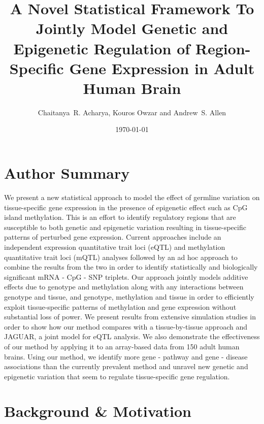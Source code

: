 \documentclass[hidelinks]{article}
\title{A Novel Statistical Framework To Jointly Model Genetic and Epigenetic Regulation of Region-Specific Gene Expression in Adult Human Brain}
\author{Chaitanya~R. Acharya, Kouros Owzar and Andrew~S. Allen}
\date{\today}
\begin{document}
\maketitle

\tableofcontents
\listoffigures
\setcounter{tocdepth}{3}

\section{Author Summary}

We present a new statistical approach to model the effect of germline variation on tissue-specific gene expression in the presence of epigenetic effect such as CpG island methylation. This is an effort to identify regulatory regions that are susceptible to both genetic and epigenetic variation resulting in tissue-specific patterns of perturbed gene expression. Current approaches include an independent expression quantitative trait loci (eQTL) and methylation quantitative trait loci (mQTL) analyses followed by an ad hoc approach to combine the results from the two in order to identify statistically and biologically significant mRNA - CpG - SNP triplets. Our approach jointly models additive effects due to genotype and methylation along with any interactions between genotype and tissue, and genotype, methylation and tissue in order to efficiently exploit tissue-specific patterns of methylation and gene expression without substantial loss of power. We present results from extensive simulation studies in order to show how our method compares with a tissue-by-tissue approach and JAGUAR, a joint model for eQTL analysis. We also demonstrate the effectiveness of our method by applying it to an array-based data from 150 adult human brains. Using our method, we identify more gene - pathway and gene - disease associations than the currently prevalent method and unravel new genetic and epigenetic variation that seem to regulate tissue-specific gene regulation.

\section{Background \& Motivation}
\end{document}
